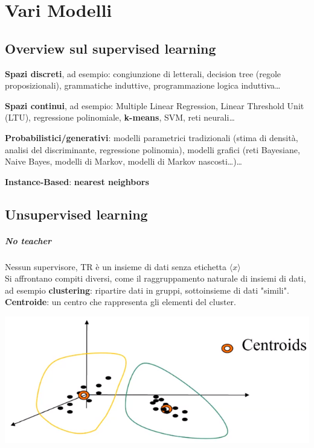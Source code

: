 \documentclass[10pt]{book}
\begin{document}
\chapter{Vari Modelli}
\section{Overview sul supervised learning}
\begin{list}{}{}
	\item \textbf{Spazi discreti}, ad esempio: congiunzione di letterali, decision tree (regole proposizionali), grammatiche induttive, programmazione logica induttiva\ldots
	\item \textbf{Spazi continui}, ad esempio: Multiple Linear Regression, Linear Threshold Unit (LTU), regressione polinomiale, \textbf{k-means}, SVM, reti neurali\ldots
	\item \textbf{Probabilistici/generativi}: modelli parametrici tradizionali (stima di densità, analisi del discriminante, regressione polinomia), modelli grafici (reti Bayesiane, Naive Bayes, modelli di Markov, modelli di Markov nascosti\ldots)\ldots
	\item \textbf{Instance-Based}: \textbf{nearest neighbors}
\end{list}
\section{Unsupervised learning}
\paragraph{No teacher} Nessun supervisore, TR è un insieme di dati senza etichetta $\langle x \rangle$\\
Si affrontano compiti diversi, come il raggruppamento naturale di insiemi di dati, ad esempio \textbf{clustering}: ripartire dati in gruppi, sottoinsieme di dati "simili". \textbf{Centroide}: un centro che rappresenta gli elementi del cluster. 
\begin{center}
	\includegraphics[scale=0.75]{mlclustering.png}
\end{center}
\end{document}

